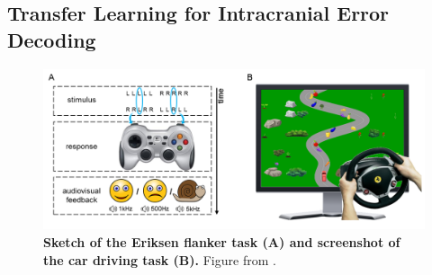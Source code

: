 \subsection{Transfer Learning for Intracranial Error
Decoding}\label{transfer-learning-for-intracranial-error-decoding}

\begin{figure}[htb]
    \myfloatalign
    \includegraphics[width=1\linewidth]{images/eriksen-flanker-car-driving-tasks.png}
    \caption[Visualizations of Eriksen flanker and  car driving task]{
\textbf{Sketch of the Eriksen flanker task (A) and screenshot of the car
driving task (B).} Figure from \citet{behncke2018cross}. 
}
\label{eriksen-flanker-car-driving-tasks-fig}
\end{figure}


